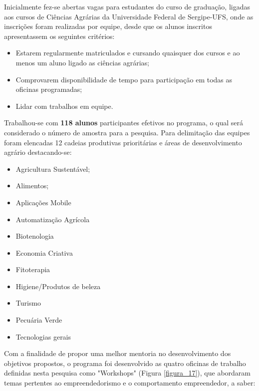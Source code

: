 Inicialmente fez-se abertas vagas para estudantes do curso de graduação, ligadas aos cursos de Ciências Agrárias da Universidade Federal de Sergipe-UFS, onde as inscrições foram realizadas por equipe, desde que os alunos inscritos apresentassem os seguintes critérios:

	
\begin{itemize}
\item{Estarem regularmente matriculados e cursando quaisquer dos cursos e ao menos um aluno ligado as ciências agrárias;}
\item{Comprovarem disponibilidade de tempo para participação em todas as oficinas programadas;}
\item{Lidar com trabalhos em equipe.}
\end{itemize}

Trabalhou-se com \textbf{118 alunos} participantes efetivos no programa, o qual será considerado o número de amostra para a pesquisa. Para delimitação das equipes foram elencadas 12 cadeias produtivas  prioritárias e áreas de desenvolvimento agrário destacando-se:

\begin{multicols}{2}
\centering
    \begin{itemize}
    \item{Agricultura Sustentável;}
    \item{Alimentos;}
    \item{Aplicações Mobile}
    \item{Automatização Agrícola}
    \item{Biotenologia}
    \item{Economia Criativa}
    \item{Fitoterapia}
    \item{Higiene/Produtos de beleza}
    \item{Turismo}
    \item{Pecuária Verde}
    \item{Tecnologias gerais}
\end{itemize}
\end{multicols}



Com a finalidade de propor uma melhor mentoria no desenvolvimento dos objetivos propostos, o programa foi desenvolvido as quatro oficinas de trabalho definidas nesta pesquisa como  "Workshops" (Figura \ref{figura_17}), que abordaram temas pertentes ao empreendedorismo e o comportamento empreendedor, a saber:


